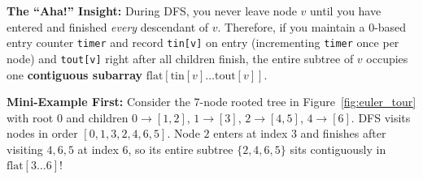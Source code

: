\documentclass[11pt,a4paper]{article}
\theoremstyle{definition}
\newcommand{\ahabeat}{\textbf{\color{accentteal}The ``Aha!'' Insight:} }
\newcommand{\examplebeat}{\textbf{\color{primaryblue}Mini-Example First:} }
\begin{document}
\ahabeat During DFS, you never leave node $v$ until you have entered and finished \emph{every} descendant of $v$. Therefore, if you maintain a $0$-based entry counter \texttt{timer} and record \texttt{tin[v]} on entry (incrementing \texttt{timer} once per node) and \texttt{tout[v]} right after all children finish, the entire subtree of $v$ occupies one \textbf{contiguous subarray} $\text{flat}[\text{tin}[v] \dots \text{tout}[v]]$.

\examplebeat Consider the 7-node rooted tree in Figure~\ref{fig:euler_tour} with root $0$ and children $0 \to [1, 2]$, $1 \to [3]$, $2 \to [4, 5]$, $4 \to [6]$. DFS visits nodes in order $[0, 1, 3, 2, 4, 6, 5]$. Node $2$ enters at index $3$ and finishes after visiting $4, 6, 5$ at index $6$, so its entire subtree $\{2, 4, 6, 5\}$ sits contiguously in $\text{flat}[3 \dots 6]$!
\end{document}
